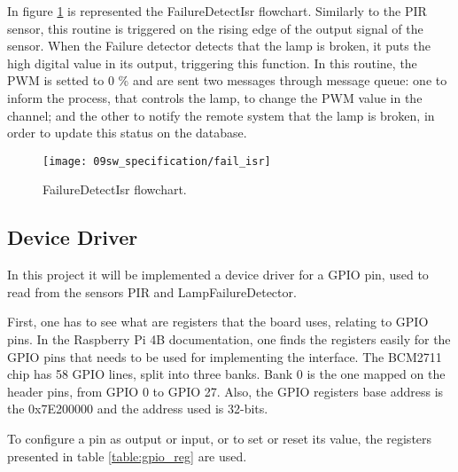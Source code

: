In figure \ref{fig:fail_isr} is represented the FailureDetectIsr flowchart. Similarly to the PIR sensor, this routine is triggered on the rising edge of the output signal of the sensor. When the Failure detector detects that the lamp is broken, it puts the high digital value in its output, triggering this function. In this routine, the PWM is setted to 0 \% and are sent two messages through message queue: one to inform the process, that controls the lamp, to change the PWM value in the channel; and the other to notify the remote system that the lamp is broken, in order to update this status on the database.

\begin{figure}[H]
	\centering
	\texttt{[image: 09sw\_specification/fail\_isr]}
	\caption{FailureDetectIsr flowchart.}
	\label{fig:fail_isr}
\end{figure}

%

\clearpage
\subsection{Device Driver}
In this project it will be implemented a device driver for a GPIO pin, used to read from the sensors PIR and LampFailureDetector.

First, one has to see what are registers that the board uses, relating to GPIO pins. In the Raspberry Pi 4B documentation, one finds the registers easily for the GPIO pins that needs to be used for implementing the interface. The BCM2711 chip has 58 GPIO lines, split into three banks. Bank 0 is the one mapped on the header pins, from GPIO 0 to GPIO 27. Also, the GPIO registers base address is the 0x7E200000 and the address used is 32-bits.

To configure a pin as output or input, or to set or reset its value, the registers presented in table \ref{table:gpio_reg} are used.

